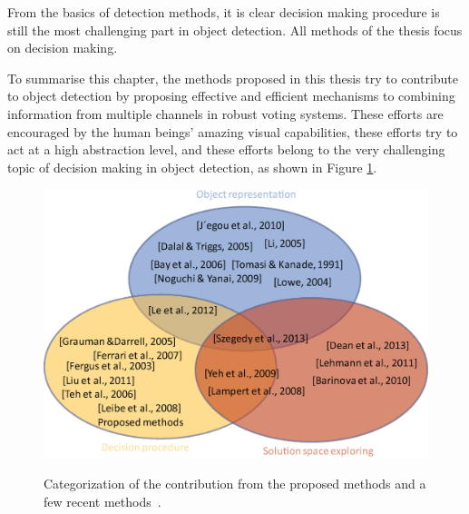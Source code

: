 From the basics of detection methods, it is clear decision making procedure is still the most challenging part in object detection. All methods of the thesis focus on decision making.

To summarise this chapter, the methods proposed in this thesis try to contribute to object detection by proposing effective and efficient mechanisms to combining information from multiple channels in robust voting systems. These efforts are encouraged by the human beings' amazing visual capabilities, these efforts try to act at a high abstraction level, and these efforts belong to the very challenging topic of decision making in object detection, as shown in Figure \ref{ord:contri}.


\begin{figure}
\centering
{
  \includegraphics[width=1\textwidth]{contri.eps}
}
\caption[Categorization of contribution.]{Categorization of the contribution from the proposed methods and a few recent methods~\citep{bgf,ij4,obof,ij2,o2,mtvvv,o12,dnnnn,pmk,ac30,ac3,lbt1,hdp,lb1,ac1,ac4,408,ac27,ac9,dnnobd}.}
\label{ord:contri}
\end{figure}
